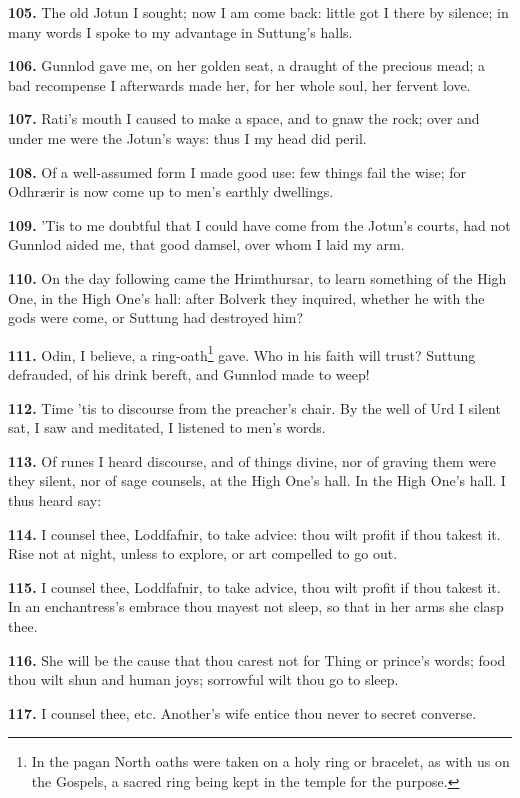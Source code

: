 \textbf{105.} The old Jotun I sought; now I am come back: little got I there
by silence; in many words I spoke to my advantage in Suttung's halls.

\textbf{106.} Gunnlod gave me, on her golden seat, a draught of the precious
mead; a bad recompense I afterwards made her, for her whole soul, her
fervent love.

\textbf{107.} Rati's mouth I caused to make a space, and to gnaw the rock;
over and under me were the Jotun's ways: thus I my head did peril.

\textbf{108.} Of a well-assumed form I made good use: few things fail the
wise; for Odhrærir is now come up to men's earthly dwellings.

\textbf{109.} 'Tis to me doubtful that I could have come from the Jotun's
courts, had not Gunnlod aided me, that good damsel, over whom I laid
my arm.

\textbf{110.} On the day following came the Hrimthursar, to learn something
of the High One, in the High One's hall: after Bolverk they inquired,
whether he with the gods were come, or Suttung had destroyed him?

\textbf{111.} Odin, I believe, a ring-oath\footnote{In the pagan North oaths were taken on a holy ring or
bracelet, as with us on the Gospels, a sacred ring being kept in the
temple for the purpose.} gave. Who in his faith will
trust? Suttung defrauded, of his drink bereft, and Gunnlod made to
weep!

\textbf{112.} Time 'tis to discourse from the preacher's chair. By the well
of Urd I silent sat, I saw and meditated, I listened to men's words.

\textbf{113.} Of runes I heard discourse, and of things divine, nor of
graving them were they silent, nor of sage counsels, at the High One's
hall. In the High One's hall. I thus heard say:

\textbf{114.} I counsel thee, Loddfafnir, to take advice: thou wilt profit if
thou takest it. Rise not at night, unless to explore, or art compelled
to go out.

\textbf{115.} I counsel thee, Loddfafnir, to take advice, thou wilt profit if
thou takest it. In an enchantress's embrace thou mayest not sleep, so
that in her arms she clasp thee.

\textbf{116.} She will be the cause that thou carest not for Thing or
prince's words; food thou wilt shun and human joys; sorrowful wilt
thou go to sleep.

\textbf{117.} I counsel thee, etc. Another's wife entice thou never to secret
converse.

